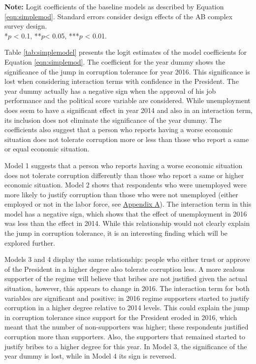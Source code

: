 \documentclass[12pt,a4]{article}\usepackage[]{graphicx}\usepackage[]{xcolor}
\begin{document}
\begin{table}[htbp]
\vspace{0.25cm}
\textbf{Note:} Logit coefficients of the baseline models as described by Equation \ref{eqn:simplemod}. Standard errors consider design effects of the AB complex survey design.\\
*$p$ < 0.1, **$p$< 0.05, ***$p$ < 0.01.
\end{table}

Table \ref{tab:simplemodel} presents the logit estimates of the model coefficients for Equation \ref{eqn:simplemod}. The coefficient for the year dummy shows the significance of the jump in corruption tolerance for year 2016. This significance is lost when considering interaction terms with confidence in the President. The year dummy actually has a negative sign when the approval of his job performance and the political score variable are considered. While unemployment does seem to have a significant effect in year 2014 and also in an interaction term, its inclusion does not eliminate the significance of the year dummy. The coefficients also suggest that a person who reports having a worse economic situation does not tolerate corruption more or less than those who report a same or equal economic situation. 

Model 1 suggests that a person who reports having a worse economic situation does not tolerate corruption differently than those who report a same or higher economic situation. Model 2 shows that respondents who were unemployed were more likely to justify corruption than those who were not unemployed (either employed or not in the labor force, see \hyperref[app:first]{Appendix A}). The interaction term in this model has a negative sign, which shows that the effect of unemployment in 2016 was less than the effect in 2014. While this relationship would not clearly explain the jump in corruption tolerance, it is an interesting finding which will be explored further. 

Models 3 and 4 display the same relationship: people who either trust or approve of the President in a higher degree also tolerate corruption less. A more zealous supporter of the regime will believe that bribes are not justified given the actual situation, however, this appears to change in 2016. The interaction term for both variables are significant and positive: in 2016 regime supporters started to justify corruption in a higher degree relative to 2014 levels. This could explain the jump in corruption tolerance since support for the President eroded in 2016, which meant that the number of non-supporters was higher; these respondents justified corruption more than supporters. Also, the supporters that remained started to justify bribes to a higher degree for this year. In Model 3, the significance of the year dummy is lost, while in Model 4 its sign is reversed.
\end{document}
